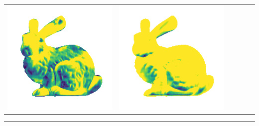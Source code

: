 \begin{tabularx}{\linewidth}{@{}Y@{}Y@{}Y@{}Y@{}Y@{}Y@{}}
\includegraphics[width=\linewidth]{semisynthetic/20160617_14_marrnet_err.png} &
\includegraphics[width=\linewidth]{semisynthetic/20160617_14_ef_err.png} \\
\end{tabularx}
\begin{center}\rule{0.5\linewidth}{\linethickness}\end{center}

